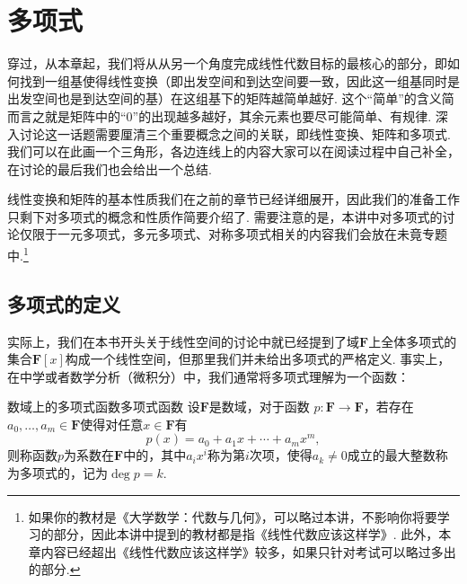 \chapter{多项式}

穿过，从本章起，我们将从从另一个角度完成线性代数目标的最核心的部分，即如何找到一组基使得线性变换（即出发空间和到达空间要一致，因此这一组基同时是出发空间也是到达空间的基）在这组基下的矩阵越简单越好. 这个``简单''的含义简而言之就是矩阵中的``0''的出现越多越好，其余元素也要尽可能简单、有规律. 深入讨论这一话题需要厘清三个重要概念之间的关联，即线性变换、矩阵和多项式. 我们可以在此画一个三角形，各边连线上的内容大家可以在阅读过程中自己补全，在讨论的最后我们也会给出一个总结.

\begin{figure}[H]
    \centering
\end{figure}

线性变换和矩阵的基本性质我们在之前的章节已经详细展开，因此我们的准备工作只剩下对多项式的概念和性质作简要介绍了. 需要注意的是，本讲中对多项式的讨论仅限于一元多项式，多元多项式、对称多项式相关的内容我们会放在未竟专题中.\footnote{如果你的教材是《大学数学：代数与几何》，可以略过本讲，不影响你将要学习的部分，因此本讲中提到的教材都是指《线性代数应该这样学》. 此外，本章内容已经超出《线性代数应该这样学》较多，如果只针对考试可以略过多出的部分.}

\section{多项式的定义}

实际上，我们在本书开头关于线性空间的讨论中就已经提到了域$\mathbf{F}$上全体多项式的集合$\mathbf{F}[x]$构成一个线性空间，但那里我们并未给出多项式的严格定义. 事实上，在中学或者数学分析（微积分）中，我们通常将多项式理解为一个函数：
\begin{definition}{数域上的多项式函数}{多项式函数} 
    设$\mathbf{F}$是数域，对于函数 $p:\mathbf{F}\to\mathbf{F}$，若存在$a_0,\ldots,a_m\in\mathbf{F}$使得对任意$x\in\mathbf{F}$有
    \begin{equation}
        p(x)=a_0+a_1x+\cdots+a_mx^m,
    \end{equation}
    则称函数$p$为系数在$\mathbf{F}$中的，其中$a_ix^i$称为第$i$次项，使得$a_k\neq 0$成立的最大整数称为多项式的，记为$\deg p=k$.
\end{definition}

